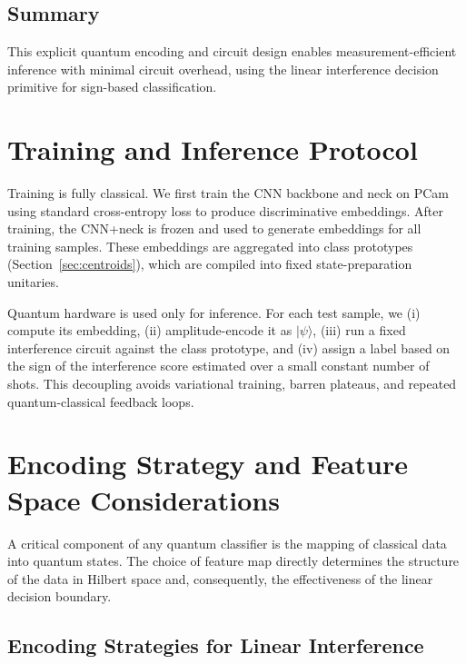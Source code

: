 \documentclass[conference]{IEEEtran}
\begin{document}
\subsection{Summary}

This explicit quantum encoding and circuit design enables measurement-efficient inference with minimal circuit overhead, using the linear interference decision primitive for sign-based classification.


\section{Training and Inference Protocol}

Training is fully classical. We first train the CNN backbone and neck on PCam using standard cross-entropy loss to produce discriminative embeddings. After training, the CNN+neck is frozen and used to generate embeddings for all training samples. These embeddings are aggregated into class prototypes (Section~\ref{sec:centroids}), which are compiled into fixed state-preparation unitaries.

Quantum hardware is used only for inference. For each test sample, we (i) compute its embedding, (ii) amplitude-encode it as $|\psi\rangle$, (iii) run a fixed interference circuit against the class prototype, and (iv) assign a label based on the sign of the interference score estimated over a small constant number of shots. This decoupling avoids variational training, barren plateaus, and repeated quantum-classical feedback loops.


\section{Encoding Strategy and Feature Space Considerations}

A critical component of any quantum classifier is the mapping of classical data into quantum states. The choice of feature map directly determines the structure of the data in Hilbert space and, consequently, the effectiveness of the linear decision boundary.

\subsection{Encoding Strategies for Linear Interference}
\end{document}
